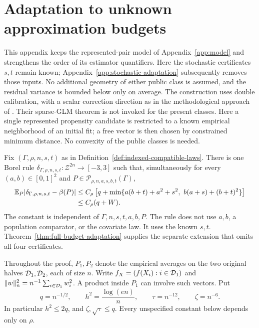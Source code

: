 \section{Adaptation to unknown approximation budgets}
\label{app:approximation-adaptation}

This appendix keeps the represented-pair model of
Appendix~\ref{app:model} and strengthens the order of its estimator
quantifiers. Here the stochastic certificates $s,t$ remain known;
Appendix~\ref{app:stochastic-adaptation} subsequently removes those inputs.
No additional
geometry of either public class is assumed, and the residual variance is
bounded below only on average. The construction uses double calibration,
with a scalar correction direction as in the methodological approach of
\citet{liu2023doublecalibration}. Their sparse-GLM theorem is not invoked
for the present classes. Here a single represented propensity candidate
is restricted to a known empirical neighborhood of an initial fit; a
free vector is then chosen by constrained minimum distance. No convexity
of the public classes is needed.

\begin{theorem}
\label{thm:approximation-adaptation}
Fix $(\Gamma,\rho,n,s,t)$ as in
Definition~\ref{def:indexed-compatible-laws}. There is one Borel rule
$\delta_{\Gamma,\rho,n,s,t}:\mathcal Z^{2n}\to[-3,3]$ such that,
simultaneously for every $(a,b)\in[0,1]^2$ and
$P\in\mathcal P_{\rho,n,a,s,b,t}(\Gamma)$,
\begin{equation}
 \begin{split}
 \mathbb E_P|\delta_{\Gamma,\rho,n,s,t}-\beta(P)|
 &\le C_\rho\left[q+
 \min\{a(b+t)+a^2+s^2,\ b(a+s)+(b+t)^2\}\right]\\
 &\le C_\rho(q+W).
 \end{split}
 \label{eq:approximation-adaptation-rate}
\end{equation}
The constant is independent of $\Gamma,n,s,t,a,b,P$. The rule does not
use $a,b$, a population comparator, or the covariate law. It uses the
known $s,t$. Theorem~\ref{thm:full-budget-adaptation} supplies
the separate extension that omits all four certificates.
\end{theorem}

Throughout the proof, $P_1,P_2$ denote the empirical averages on the two
original halves $\mathcal D_1,\mathcal D_2$, each of size $n$. Write
$f_X=(f(X_i):i\in\mathcal D_1)$ and
$\|w\|_n^2=n^{-1}\sum_{i\in\mathcal D_1}w_i^2$. A product inside $P_1$
can involve such vectors. Put
\begin{equation}
 q=n^{-1/2},\qquad h^2=\frac{\log(en)}n,
 \qquad\tau=n^{-12},\qquad\zeta=n^{-6}.
 \label{eq:approximation-scales}
\end{equation}
In particular $h^2\le2q$, and $\zeta,\sqrt\tau\le q$.
Every unspecified constant below depends only on $\rho$.


